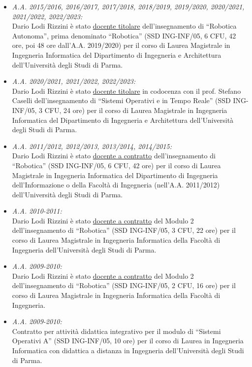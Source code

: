 \documentclass[11pt]{article}
\newcommand{\ITEMDATE}[1]{\item \textit{#1:}\\}
\begin{document}
\begin{itemize}
\ITEMDATE{A.A. 2015/2016, 2016/2017, 2017/2018, 2018/2019, 2019/2020, 2020/2021, 2021/2022, 2022/2023}
Dario Lodi Rizzini \`e stato \underline{docente titolare} dell'insegnamento di ``Robotica Autonoma'', prima denominato ``Robotica'' (SSD ING-INF/05, 6 CFU, 42 ore, poi 48 ore dall'A.A. 2019/2020)
per il corso di Laurea Magistrale in Ingegneria Informatica del Dipartimento di Ingegneria e Architettura 
dell'Universit\`a degli Studi di Parma. 

\ITEMDATE{A.A. 2020/2021, 2021/2022, 2022/2023}
Dario Lodi Rizzini \`e stato \underline{docente titolare} in codocenza con il prof. Stefano Caselli dell'insegnamento di ``Sistemi Operativi e in Tempo Reale'' (SSD ING-INF/05, 3 CFU, 24 ore)
per il corso di Laurea Magistrale in Ingegneria Informatica del Dipartimento di Ingegneria e Architettura 
dell'Universit\`a degli Studi di Parma.

\ITEMDATE{A.A. 2011/2012, 2012/2013, 2013/2014, 2014/2015}
Dario Lodi Rizzini \`e stato \underline{docente a contratto} dell'insegnamento di ``Robotica'' (SSD ING-INF/05, 6 CFU, 42 ore)
per il corso di Laurea Magistrale in Ingegneria Informatica del Dipartimento di Ingegneria dell'Informazione 
o della Facolt\`a di Ingegneria (nell'A.A. 2011/2012)
dell'Universit\`a degli Studi di Parma.


\ITEMDATE{A.A. 2010-2011}
Dario Lodi Rizzini \`e stato \underline{docente a contratto} del Modulo 2 dell'insegnamento di ``Robotica'' 
(SSD ING-INF/05, 3 CFU, 22 ore) per il corso di Laurea Magistrale in Ingegneria Informatica 
della Facolt\`a di Ingegneria dell'Universit\`a degli Studi di Parma.

\ITEMDATE{A.A. 2009-2010}
Dario Lodi Rizzini \`e stato \underline{docente a contratto} del Modulo 2 dell'insegnamento di ``Robotica'' 
(SSD ING-INF/05, 2 CFU, 16 ore) per il corso di Laurea Magistrale in Ingegneria Informatica della Facolt\`a di Ingegneria.

\ITEMDATE{A.A. 2009-2010}
Contratto per attivit\`a didattica integrativo per il modulo di
``Sistemi Operativi A'' (SSD ING-INF/05, 10 ore) per il corso di Laurea in Ingegneria Informatica con didattica a 
distanza in Ingegneria dell'Universit\`a degli Studi di Parma.
\end{itemize}
\end{document}
